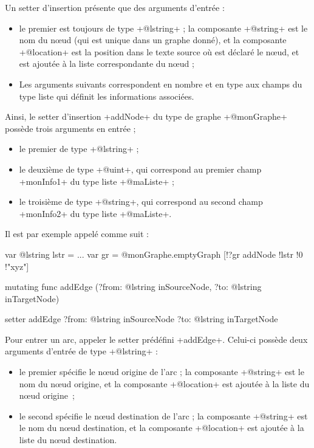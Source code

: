 Un setter d'insertion présente que des arguments d'entrée :
\begin{itemize}
  \item le premier est toujours de type \ggst+@lstring+ ; la composante \ggst+@string+ est le nom du nœud (qui est unique dans un graphe donné), et la composante \ggst+@location+ est la position dans le texte source où est déclaré le nœud, et est ajoutée à la liste correspondante du nœud ;
  \item Les arguments suivants correspondent en nombre et en type aux champs du type liste qui définit les informations associées.
\end{itemize}

Ainsi, le setter d'insertion \ggst+addNode+ du type de graphe \ggst+@monGraphe+ possède trois arguments en entrée ;
\begin{itemize}
  \item le premier de type \ggst+@lstring+ ;
  \item le deuxième de type \ggst+@uint+, qui correspond au premier champ \ggst+monInfo1+ du type liste \ggst+@maListe+ ;
  \item le troisième de type \ggst+@string+, qui correspond au second champ \ggst+monInfo2+ du type liste \ggst+@maListe+.
\end{itemize}

Il est par exemple appelé comme suit :
\begin{galgas3}
var @lstring lstr = ...
var gr = @monGraphe.emptyGraph
[!?gr addNode !lstr !0 !"xyz"]
\end{galgas3}





\begin{galgas4}
mutating func addEdge (?from: @lstring inSourceNode, ?to: @lstring inTargetNode)
\end{galgas4}

\begin{galgas3}
setter addEdge ?from: @lstring inSourceNode ?to: @lstring inTargetNode
\end{galgas3}

Pour entrer un arc, appeler le setter prédéfini \ggst+addEdge+. Celui-ci possède deux arguments d'entrée de type \ggst+@lstring+ :
\begin{itemize}
  \item le premier spécifie le nœud origine de l'arc ; la composante \ggst+@string+ est le nom du nœud origine, et la composante \ggst+@location+ est ajoutée à la liste du nœud origine~;
  \item le second spécifie le nœud destination de l'arc ; la composante \ggst+@string+ est le nom du nœud destination, et la composante \ggst+@location+ est ajoutée à la liste du nœud destination.
\end{itemize}







